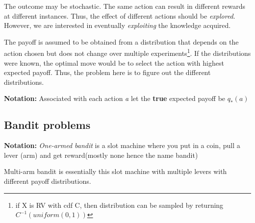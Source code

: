 \documentclass[a4paper]{article}
\begin{document}
The outcome may be stochastic. The same action can result in different rewards at different instances. Thus, the effect of different actions should be \textit{explored}. However, we are interested in eventually \textit{exploiting} the knowledge acquired.

The payoff is assumed to be obtained from a distribution that depends on the action chosen but does not change over multiple experiments\footnote{if X is RV with cdf C, then distribution can be sampled by returning $C^{-1}(uniform(0,1))$}. If the distributions were known, the optimal move would be to select the action with highest expected payoff. Thus, the problem here is to figure out the different distributions.

\textbf{Notation:} Associated with each action \textit{a} let the \textbf{true} expected payoff be $q_*(a)$

\subsection{Bandit problems}
\textbf{Notation:} \textit{One-armed bandit} is a slot machine where you put in a coin, pull a lever (arm) and get reward(mostly none hence the name bandit)

Multi-arm bandit is essentially this slot machine with multiple levers with different payoff distributions.
\end{document}
